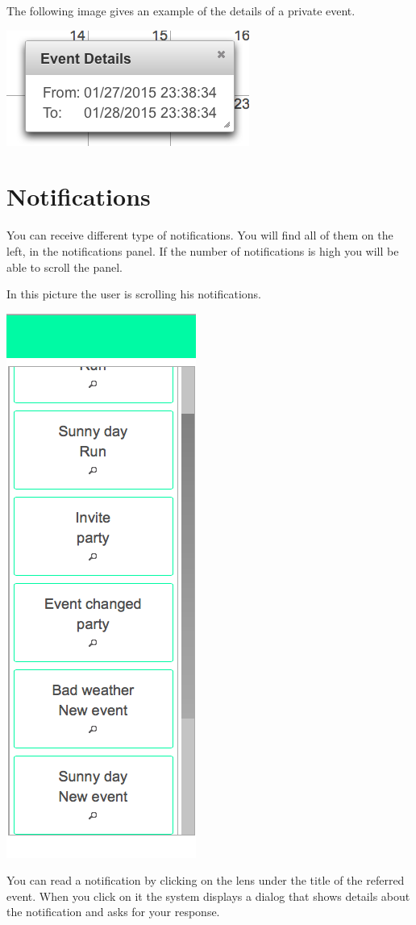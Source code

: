 \documentclass[10pt,a4paper,titlepage]{article}
\begin{document}
The following image gives an example of the details of a private event.

\begin{center}
\includegraphics[width=0.7\linewidth]{./images/23_event_details_private}
\end{center}

\section{Notifications}
You can receive different type of notifications. You will find all of them on the left, in the notifications panel. If the number of notifications is high you will be able to scroll the panel.

In this picture the user is scrolling his notifications.

\begin{center}
\includegraphics[width=0.3\linewidth]{./images/24_notification_scroll}
\end{center}

You can read a notification by clicking on the lens under the title of the referred event. When you click on it the system displays a dialog that shows details about the notification and asks for your response.
\end{document}
